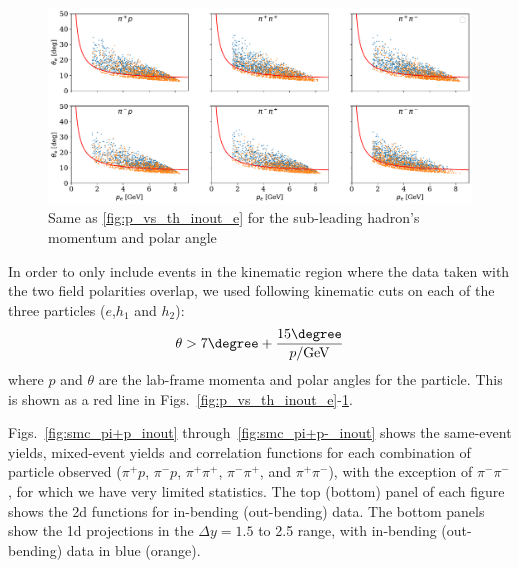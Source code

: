 \begin{figure}
    \centering
    \includegraphics[width=\textwidth]{p_vs_th_inout_e}
    \caption{Same as \ref{fig:p_vs_th_inout_e} for the sub-leading hadron's momentum and polar angle}
    \label{fig:p_vs_th_inout_h2}
\end{figure}

In order to only include events in the kinematic region where the data taken with the two field polarities overlap, we used following kinematic cuts on each of the three particles ($e$,$h_1$ and $h_2$):
\begin{equation}
    \theta > 7\degree + \frac{15\degree}{p/{\rm GeV}}
\end{equation}
where $p$ and $\theta$ are the lab-frame momenta and polar angles for the particle.  This is shown as a red line in Figs.~\ref{fig:p_vs_th_inout_e}-\ref{fig:p_vs_th_inout_h2}.  



Figs.~\ref{fig:smc_pi+p_inout} through~\ref{fig:smc_pi+p-_inout} shows the same-event yields, mixed-event yields and correlation functions for each combination of particle observed ($\pi^+ p$, $\pi^- p$, $\pi^+\pi^+$, $\pi^-\pi^+$, and $\pi^+\pi^-$), with the exception of $\pi^-\pi^-$, for which we have very limited statistics. The top (bottom) panel of each figure shows the 2d functions for in-bending (out-bending) data.  The bottom panels show the 1d projections in the $\Delta y=1.5$ to 2.5 range, with in-bending (out-bending) data in blue (orange).  
